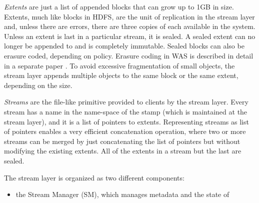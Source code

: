 \emph{Extents} are just a list of appended blocks that can grow up to 1GB in size.
Extents, much like blocks in HDFS, are the unit of replication in the stream layer and, unless there are errors, there are three copies of each available in the system.
Unless an extent is last in a particular stream, it is sealed.
A sealed extent can no longer be appended to and is completely immutable.
Sealed blocks can also be erasure coded, depending on policy.
Erasure coding in WAS is described in detail in a separate paper \cite{DBLP:conf/usenix/HuangSXOCG0Y12}.
To avoid excessive fragmentation of small objects, the stream layer appends multiple objects to the same block or the same extent, depending on the size.

\emph{Streams} are the file-like primitive provided to clients by the stream layer.
Every stream has a name in the name-space of the stamp (which is maintained at the stream layer), and it is a list of pointers to extents.
Representing streams as list of pointers enables a very efficient concatenation operation, where two or more streams can be merged by just concatenating the list of pointers but without modifying the existing extents.
All of the extents in a stream but the last are sealed.

The stream layer is organized as two different components:
\begin{itemize}
    \item the Stream Manager (SM), which manages metadata and the state of 
\end{itemize}

\clearpage
